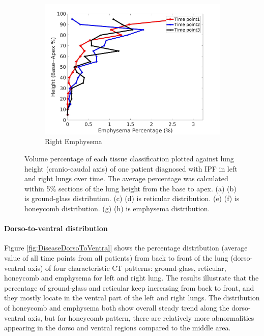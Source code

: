 \begin{figure}[H]
\begin{subfigure}{.42\linewidth}
  \includegraphics[width=\linewidth,trim={{.0\wd0} {.0\wd0} {.0\wd0} {.0\wd0}},clip]{QuantitativeAnalysis/Image/IPF21RightLungEmphysemaDiseaseAgainstHeight.jpg}
  \caption{Right Emphysema}
  \label{fig:IPF21DiseaseAgainstHeightMain-h}
\end{subfigure}
\caption{Volume percentage of each tissue classification plotted against lung height (cranio-caudal axis) of one patient diagnosed with IPF in left and right lungs over time. The average percentage was calculated within 5\% sections of the lung height from the base to apex. (a) (b) is ground-glass distribution. (c) (d) is reticular distribution. (e) (f) is honeycomb distribution. (g) (h) is emphysema distribution.}
\label{fig:IPF21DiseaseAgainstHeightMain}
\end{figure}

\paragraph{Dorso-to-ventral distribution}
Figure \ref{fig:DiseaseDorsoToVentral} shows the percentage distribution (average value of all time points from all patients) from back to front of the lung (dorso-ventral axis) of four characteristic CT patterns: ground-glass, reticular, honeycomb and emphysema for left and right lung. The results illustrate that the percentage of ground-glass and reticular keep increasing from back to front, and they mostly locate in the ventral part of the left and right lungs. The distribution of honeycomb and emphysema both show overall steady trend along the dorso-ventral axis, but for honeycomb pattern, there are relatively more abnormalities appearing in the dorso and ventral regions compared to the middle area.

